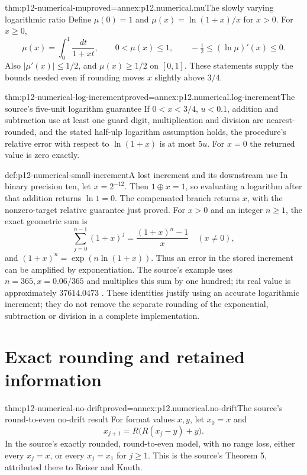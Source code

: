 \begin{hblemma}{thm:p12-numerical-mu}{proved=annex:p12.numerical.mu}{The slowly varying logarithmic ratio}
Define \(\mu(0)=1\) and \(\mu(x)=\ln(1+x)/x\) for \(x>0\).
For \(x\geq0\),
\[
 \mu(x)=\int_0^1\frac{dt}{1+xt},\qquad
 0<\mu(x)\leq1,\qquad
 -\tfrac12\leq(\ln\mu)'(x)\leq0.
\]
Also \(|\mu'(x)|\leq1/2\), and \(\mu(x)\geq1/2\) on
\([0,1]\). These statements supply the bounds needed even if rounding
moves \(x\) slightly above \(3/4\).
\end{hblemma}

\begin{hbtheorem}{thm:p12-numerical-log-increment}{proved=annex:p12.numerical.log-increment}{The source's five-unit logarithm guarantee}
If \(0<x<3/4\), \(u<0.1\), addition and subtraction use at least one
guard digit, multiplication and division are nearest-rounded, and the
stated half-ulp logarithm assumption holds, the procedure's relative
error with respect to \(\ln(1+x)\)
is at most \(5u\). For \(x=0\) the returned value is zero exactly.
\end{hbtheorem}

\begin{hbexample}{def:p12-numerical-small-increment}{A lost increment and its downstream use}
In binary precision ten, let \(x=2^{-12}\). Then
\(1\oplus x=1\), so evaluating a logarithm after that addition
returns \(\ln1=0\). The compensated branch returns \(x\), with
the nonzero-target relative guarantee just proved.
For \(x>0\) and an integer \(n\geq1\), the exact geometric sum is
\[
 \sum_{j=0}^{n-1}(1+x)^j=\frac{(1+x)^n-1}{x}
 \quad(x\ne0),
\]
and \((1+x)^n=\exp(n\ln(1+x))\). Thus an error in the stored
increment can be amplified by exponentiation. The source's example
uses \(n=365,x=0.06/365\) and multiplies this sum by one hundred;
its real value is approximately \(37614.0473\)
\cite[Section D.3.4, pp.~D-11--D-12]{GoldbergOracle8193693}.
These identities justify using an accurate logarithmic increment;
they do not remove the separate rounding of the exponential,
subtraction or division in a complete implementation.
\end{hbexample}

\section{Exact rounding and retained information}

\begin{hbtheorem}{thm:p12-numerical-no-drift}{proved=annex:p12.numerical.no-drift}{The source's round-to-even no-drift result}
For format values \(x,y\), let \(x_0=x\) and
\[
 x_{j+1}=R\bigl(R(x_j-y)+y\bigr).
\]
In the source's exactly rounded, round-to-even model, with no range
loss, either every \(x_j=x\), or every \(x_j=x_1\) for \(j\geq1\).
This is the source's Theorem 5, attributed there to Reiser and Knuth.
\end{hbtheorem}

